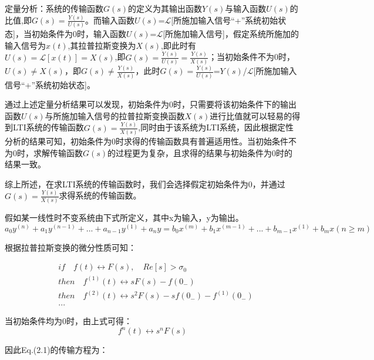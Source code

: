 \documentclass{article}
\numberwithin{equation}{section}
\numberwithin{figure}{section}
\begin{document}
定量分析：系统的传输函数$G(s)$的定义为其输出函数$Y(s)$与输入函数$U(s)$的比值,即$G(s)=\frac{Y(s)}{U(s)}$。而输入函数$U(s)$=$\mathscr{L}$[所施加输入信号“+”系统初始状态]，当初始条件为0时，输入函数$U(s)$=$\mathscr{L}$[所施加输入信号]，假定系统所施加的输入信号为$x(t)$,其拉普拉斯变换为$X(s)$,即此时有$U(s)=\mathscr{L}[x(t)]=X(s)$,即$G(s)=\frac{Y(s)}{U(s)}=\frac{Y(s)}{X(s)}$；当初始条件不为0时，$U(s)≠X(s)$，即$G(s)≠\frac{Y(s)}{X(s)}$，此时$G(s)=\frac{Y(s)}{U(s)}$=$Y(s)$/$\mathscr{L}$[所施加输入信号“+”系统初始状态]。

通过上述定量分析结果可以发现，初始条件为0时，只需要将该初始条件下的输出函数$U(s)$与所施加输入信号的拉普拉斯变换函数$X(s)$进行比值就可以轻易的得到LTI系统的传输函数$G(s)=\frac{Y(s)}{X(s)}$,同时由于该系统为LTI系统，因此根据定性分析的结果可知，初始条件为0时求得的传输函数具有普遍适用性。当初始条件不为0时，求解传输函数$G(s)$的过程更为复杂，且求得的结果与初始条件为0时的结果一致。

综上所述，在求LTI系统的传输函数时，我们会选择假定初始条件为0，并通过$G(s)=\frac{Y(s)}{X(s)}$求得系统的传输函数。

假如某一线性时不变系统由下式所定义，其中x为输入，y为输出。
\begin{equation}
    a_0y^{(n)}+a_1y^{(n-1)}+...+a_{n-1}y^{(1)}+a_ny = b_0x^{(m)}+b_1x^{(m-1)}+...+b_{m-1}x^{(1)}+b_mx   (n ≥ m)
\end{equation}

根据拉普拉斯变换的微分性质可知：

\begin{equation}
    \begin{split}
        &if \quad f(t)\longleftrightarrow F(s), \quad Re[s]>\sigma _0\\
        &then \quad f^{(1)}(t)\longleftrightarrow sF(s)-f(0_-)\\
        &then \quad f^{(2)}(t)\longleftrightarrow s^2F(s)-sf(0_-)-f^{(1)}(0_-)\\
        &...
    \end{split}
\end{equation}

当初始条件均为0时，由上式可得：
\begin{equation}
    f^{n}(t)\longleftrightarrow s^nF(s)
\end{equation}


因此Eq.(2.1)的传输方程为：
\end{document}
